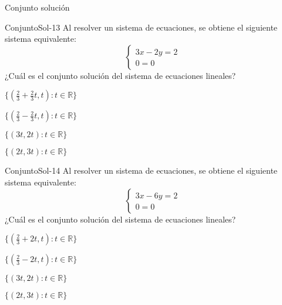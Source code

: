 \documentclass[a4,11pt]{aleph-notas}
\begin{document}
\begin{quiz}{Conjunto solución}
\begin{multi}[]%
    {ConjuntoSol-13}
    Al resolver un sistema de ecuaciones, se obtiene el siguiente sistema equivalente:
    \[
        \begin{cases}
            3x - 2y = 2 \\
            0 = 0
        \end{cases}
    \]
    ¿Cuál es el conjunto solución del sistema de ecuaciones lineales?
    \item* $\{(\frac{2}{3}+\frac{2}{3}t, t) : t\in \mathbb{R}\}$
    \item $\{(\frac{2}{3}-\frac{2}{3}t, t) : t\in \mathbb{R}\}$
    \item $\{(3t,2t) : t\in \mathbb{R}\}$
    \item $\{(2t,3t) : t\in \mathbb{R}\}$
\end{multi}

\begin{multi}[]%
    {ConjuntoSol-14}
    Al resolver un sistema de ecuaciones, se obtiene el siguiente sistema equivalente:
    \[
        \begin{cases}
            3x - 6y = 2 \\
            0 = 0
        \end{cases}
    \]
    ¿Cuál es el conjunto solución del sistema de ecuaciones lineales?
    \item* $\{(\frac{2}{3}+2t, t) : t\in \mathbb{R}\}$
    \item $\{(\frac{2}{3}-2t, t) : t\in \mathbb{R}\}$
    \item $\{(3t,2t) : t\in \mathbb{R}\}$
    \item $\{(2t,3t) : t\in \mathbb{R}\}$
\end{multi}
\end{quiz}
\end{document}
